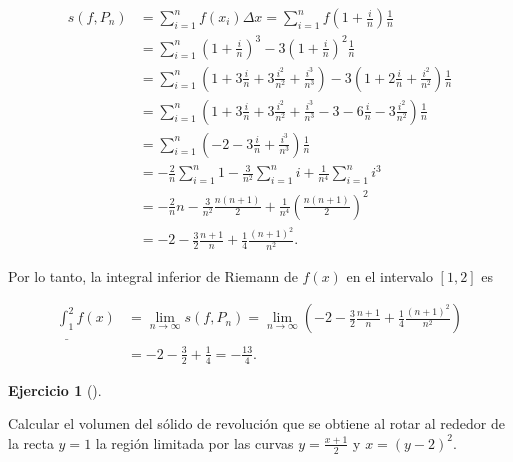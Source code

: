 \documentclass[
  a4paper,
]{scrreport}
\theoremstyle{definition}
\newtheorem{exercise}{Ejercicio}[chapter]
\theoremstyle{remark}
\begin{document}
\begin{tcolorbox}
\begin{align*}
s(f,P_n) 
&= \sum_{i=1}^{n} f(x_i) \Delta x = \sum_{i=1}^{n} f\left(1 + \frac{i}{n}\right) \frac{1}{n} \\
&= \sum_{i=1}^{n} \left(1 + \frac{i}{n}\right)^3 - 3\left(1 + \frac{i}{n}\right)^2 \frac{1}{n} \\
&= \sum_{i=1}^{n} \left(1 + 3\frac{i}{n} + 3\frac{i^2}{n^2} + \frac{i^3}{n^3}\right) - 3\left(1 + 2\frac{i}{n} + \frac{i^2}{n^2}\right) \frac{1}{n} \\
&= \sum_{i=1}^{n} \left(1 + 3\frac{i}{n} + 3\frac{i^2}{n^2} + \frac{i^3}{n^3} - 3 - 6\frac{i}{n} - 3\frac{i^2}{n^2}\right) \frac{1}{n}\\
&= \sum_{i=1}^{n} \left(-2 - 3\frac{i}{n} + \frac{i^3}{n^3}\right) \frac{1}{n}\\
&= -\frac{2}{n} \sum_{i=1}^{n} 1 - \frac{3}{n^2} \sum_{i=1}^{n} i + \frac{1}{n^4}\sum_{i=1}^{n} i^3 \\
&= -\frac{2}{n} n - \frac{3}{n^2} \frac{n(n+1)}{2} + \frac{1}{n^4} \left(\frac{n(n+1)}{2}\right)^2 \\
&= -2 - \frac{3}{2} \frac{n+1}{n} + \frac{1}{4} \frac{(n+1)^2}{n^2}.
\end{align*}

Por lo tanto, la integral inferior de Riemann de \(f(x)\) en el
intervalo \([1, 2]\) es

\begin{align*}
\underline{\int_1^2} f(x) 
&= \lim_{n \to \infty} s(f,P_n) 
= \lim_{n \to \infty} \left(-2 - \frac{3}{2} \frac{n+1}{n} + \frac{1}{4} \frac{(n+1)^2}{n^2}\right) \\
&= -2 - \frac{3}{2} + \frac{1}{4} = -\frac{13}{4}.
\end{align*}

\end{tcolorbox}

\begin{exercise}[]\protect\hypertarget{exr-2}{}\label{exr-2}

Calcular el volumen del sólido de revolución que se obtiene al rotar al
rededor de la recta \(y=1\) la región limitada por las curvas
\(y=\frac{x+1}{2}\) y \(x=(y-2)^2\).

\end{exercise}
\end{document}
